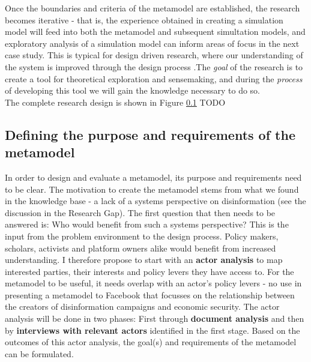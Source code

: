 Once the boundaries and criteria of the metamodel are established, the research becomes iterative - that is, the experience obtained in creating a simulation model will feed into both the metamodel and subsequent simultation models, and exploratory analysis of a simulation model can inform areas of focus in the next case study. This is typical for design driven research, where our understanding of the system is improved through the design process \citep{Hevner2004}.The \textit{goal} of the research is to create a tool for theoretical exploration and sensemaking, and during the \textit{process} of developing this tool we will gain the knowledge necessary to do so. \\

The complete research design is shown in Figure \ref{} TODO


\subsection{Defining the purpose and requirements of the metamodel}
In order to design and evaluate a metamodel, its purpose and requirements need to be clear. The motivation to create the metamodel stems from what we found in the knowledge base - a lack of a systems perspective on disinformation (see the discussion in the Research Gap). The first question that then needs to be answered is: Who would benefit from such a systems perspective? This is the input from the problem environment to the design process. Policy makers, scholars, activists and platform owners alike would benefit from increased understanding. I therefore propose to start with an \textbf{actor analysis} to map interested parties, their interests and policy levers they have access to. For the metamodel to be useful, it needs overlap with an actor's policy levers - no use in presenting a metamodel to Facebook that focusses on the relationship between the creators of disinformation campaigns and economic security. The actor analysis will be done in two phases: First through \textbf{document analysis} and then by \textbf{interviews with relevant actors} identified in the first stage.  Based on the outcomes of this actor analysis, the goal(s) and requirements of the metamodel can be formulated. \\


